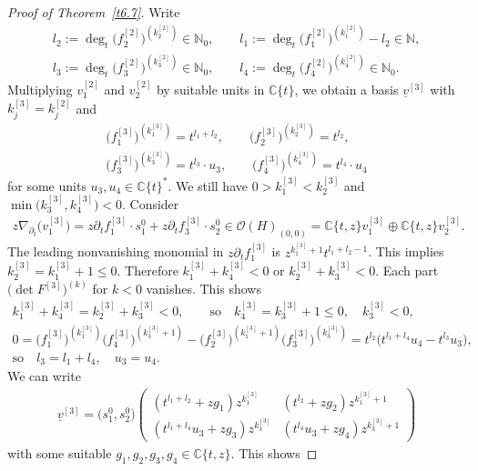 \documentclass[pdftex]{sigma}%
\numberwithin{equation}{section}
\numberwithin{figure}{section}
\newcommand{\N}{{\mathbb N}}
\newcommand{\C}{{\mathbb C}}
\newcommand{\OO}{{\mathcal O}}
\newcommand{\uuuu}{\underline}
\newcommand{\paa}{\partial}
\newcommand{\nnn}{\nabla}
\begin{document}
\begin{proof}[Proof of Theorem~\ref{t6.7}]
Write
\begin{gather*}
l_2:=\deg_t\big(f_2^{[2]}\big)^{(k_2^{[2]})}\in\N_0,\qquad
l_1:=\deg_t \big(f_1^{[2]}\big)^{(k_1^{[2]})}-l_2\in\N,
\\
l_3:=\deg_t\big(f_3^{[2]}\big)^{(k_3^{[2]})}\in\N_0,\qquad
l_4:=\deg_t \big(f_4^{[2]}\big)^{(k_4^{[2]})}\in\N_0.
\end{gather*}
Multiplying $v_1^{[2]}$ and $v_2^{[2]}$ by suitable units in
$\C\{t\}$, we obtain a basis $\uuuu{v}^{[3]}$ with
$k_j^{[3]}=k_j^{[2]}$ and
\begin{gather*}
\big(f_1^{[3]}\big)^{(k_1^{[3]})}=t^{l_1+l_2},\qquad
\big(f_2^{[3]}\big)^{(k_2^{[3]})}=t^{l_2},
\\
\big(f_3^{[3]}\big)^{(k_3^{[3]})}=t^{l_3}\cdot u_3,\qquad
\big(f_4^{[3]}\big)^{(k_4^{[3]})}=t^{l_4}\cdot u_4
\end{gather*}
for some units $u_3,u_4\in\C\{t\}^*$.
We still have $0>k_1^{[3]}<k_2^{[3]}$ and
$\min\big(k_3^{[3]},k_4^{[3]}\big)<0$. Consider
\begin{gather*}
z\nnn_{\paa_t}\big(v_1^{[3]}\big)=z\paa_t f_1^{[3]}\cdot s_1^0 +
z\paa_t f_3^{[3]}\cdot s_2^0 \in \OO(H)_{(0,0)}
=\C\{t,z\}v_1^{[3]} \oplus \C\{t,z\}v_2^{[3]}.
\end{gather*}
The leading nonvanishing monomial in $z\paa_t f_1^{[3]}$
is $z^{k_1^{[3]}+1}t^{l_1+l_2-1}$.
This implies $k_2^{[3]}=k_1^{[3]}+1\leq 0$.
Therefore $k_1^{[3]}+k_4^{[3]}<0$ or
$k_2^{[3]}+k_3^{[3]}<0$. Each part
$\big(\det F^{[3]}\big)^{(k)}$ for $k<0$ vanishes. This shows
\begin{gather*}
k_1^{[3]}+k_4^{[3]}=k_2^{[3]}+k_3^{[3]}<0, \qquad \text{so}\quad
k_4^{[3]}=k_3^{[3]}+1\leq 0,\quad k_3^{[3]}<0,
\\
0=\big(f_1^{[3]}\big)^{(k_1^{[3]})} \big(f_4^{[3]}\big)^{(k_3^{[3]}+1)}
-\big(f_2^{[3]}\big)^{(k_1^{[3]}+1)} \big(f_3^{[3]}\big)^{(k_3^{[3]})}
= t^{l_2}\bigl(t^{l_1+l_4}u_4 - t^{l_3}u_3\bigr),
\\
\text{so}\quad l_3=l_1+l_4, \quad u_3=u_4.
\end{gather*}
We can write
\begin{gather*}
\uuuu{v}^{[3]}= \big(s_1^0,s_2^0\big)\begin{pmatrix}
(t^{l_1+l_2}+zg_1)z^{k_1^{[3]}} & (t^{l_2}+zg_2)z^{k_1^{[3]}+1} \\
(t^{l_1+l_4}u_3 + zg_3)z^{k_3^{[3]}} & (t^{l_4}u_3 + zg_4)z^{k_3^{[3]}+1}
\end{pmatrix}
\end{gather*}
with some suitable $g_1,g_2,g_3,g_4\in\C\{t,z\}$.
This shows

\end{proof}
\end{document}
